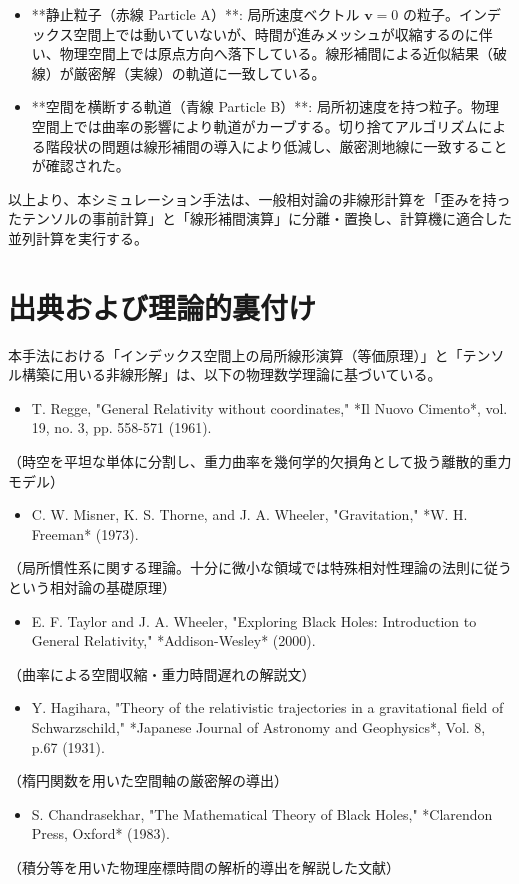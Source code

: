 \documentclass[11pt]{ltjsarticle}
\begin{document}
\begin{itemize}
\item **静止粒子（赤線 Particle A）**: 局所速度ベクトル $\mathbf{v}=0$ の粒子。インデックス空間上では動いていないが、時間が進みメッシュが収縮するのに伴い、物理空間上では原点方向へ落下している。線形補間による近似結果（破線）が厳密解（実線）の軌道に一致している。
\item **空間を横断する軌道（青線 Particle B）**: 局所初速度を持つ粒子。物理空間上では曲率の影響により軌道がカーブする。切り捨てアルゴリズムによる階段状の問題は線形補間の導入により低減し、厳密測地線に一致することが確認された。

\end{itemize}
以上より、本シミュレーション手法は、一般相対論の非線形計算を「歪みを持ったテンソルの事前計算」と「線形補間演算」に分離・置換し、計算機に適合した並列計算を実行する。

\section{出典および理論的裏付け}

本手法における「インデックス空間上の局所線形演算（等価原理）」と「テンソル構築に用いる非線形解」は、以下の物理数学理論に基づいている。

\begin{itemize}
\item [1] T. Regge, "General Relativity without coordinates," *Il Nuovo Cimento*, vol. 19, no. 3, pp. 558-571 (1961).
\end{itemize}
  （時空を平坦な単体に分割し、重力曲率を幾何学的欠損角として扱う離散的重力モデル）
\begin{itemize}
\item [2] C. W. Misner, K. S. Thorne, and J. A. Wheeler, "Gravitation," *W. H. Freeman* (1973).
\end{itemize}
  （局所慣性系に関する理論。十分に微小な領域では特殊相対性理論の法則に従うという相対論の基礎原理）
\begin{itemize}
\item [3] E. F. Taylor and J. A. Wheeler, "Exploring Black Holes: Introduction to General Relativity," *Addison-Wesley* (2000).
\end{itemize}
  （曲率による空間収縮・重力時間遅れの解説文）
\begin{itemize}
\item [4] Y. Hagihara, "Theory of the relativistic trajectories in a gravitational field of Schwarzschild," *Japanese Journal of Astronomy and Geophysics*, Vol. 8, p.67 (1931).
\end{itemize}
  （楕円関数を用いた空間軸の厳密解の導出）
\begin{itemize}
\item [5] S. Chandrasekhar, "The Mathematical Theory of Black Holes," *Clarendon Press, Oxford* (1983).
\end{itemize}
  （積分等を用いた物理座標時間の解析的導出を解説した文献）
\end{document}
